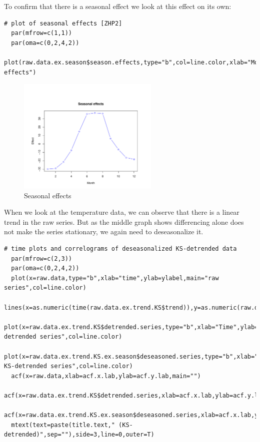 To confirm that there is a seasonal effect we look at this effect on its own: 

\begin{lstlisting}
# plot of seasonal effects [ZHP2]
  par(mfrow=c(1,1))
  par(oma=c(0,2,4,2))
  plot(raw.data.ex.season$season.effects,type="b",col=line.color,xlab="Month",ylab="Effect",main="Seasonal effects")
\end{lstlisting}


\begin{figure}[H]
\centering
\includegraphics[width=0.6\textwidth]{plots/ZHP2.pdf}
\caption{Seasonal effects}
\end{figure}

When we look at the temperature data, we can observe that there is a linear trend in the raw series. But as the middle graph shows differencing alone does not make the series stationary, we again need to deseasonalize it.

\begin{lstlisting}
# time plots and correlograms of deseasonalized KS-detrended data
  par(mfrow=c(2,3))
  par(oma=c(0,2,4,2))
  plot(x=raw.data,type="b",xlab="time",ylab=ylabel,main="raw series",col=line.color)
  lines(x=as.numeric(time(raw.data.ex.trend.KS$trend)),y=as.numeric(raw.data.ex.trend.KS$trend),col="red")
  plot(x=raw.data.ex.trend.KS$detrended.series,type="b",xlab="Time",ylab=ylabel,main="KS-detrended series",col=line.color)
  plot(x=raw.data.ex.trend.KS.ex.season$deseasoned.series,type="b",xlab="time",ylab=ylabel,main="deseasonalized KS-detrended series",col=line.color)
  acf(x=raw.data,xlab=acf.x.lab,ylab=acf.y.lab,main="")
  acf(x=raw.data.ex.trend.KS$detrended.series,xlab=acf.x.lab,ylab=acf.y.lab,main="")
  acf(x=raw.data.ex.trend.KS.ex.season$deseasoned.series,xlab=acf.x.lab,ylab=acf.y.lab,main="")
  mtext(text=paste(title.text," (KS-detrended)",sep=""),side=3,line=0,outer=T)
\end{lstlisting}

